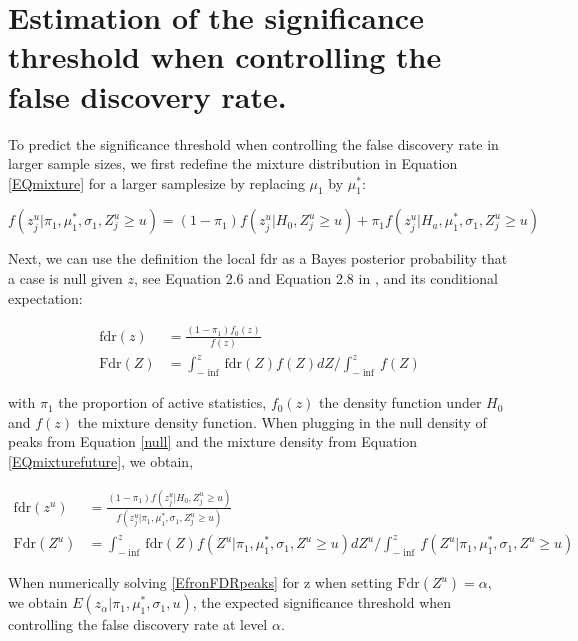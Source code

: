 \section{Estimation of the significance threshold when controlling the false discovery rate. \label{App.FDR}}

{\color{Cyan}
To predict the significance threshold when controlling the false discovery rate in larger sample sizes, we first redefine the mixture distribution in Equation \ref{EQmixture} for a larger samplesize by replacing $\mu_1$ by $\mu_1^*$:

\begin{equation} \label{EQmixturefuture}
  f(z^u_j|\pi_1,\mu_1^*,\sigma_1,Z^u_j\geq u) = (1-\pi_1) f(z^u_j|H_0,Z^u_j\geq u) + \pi_1 f(z^u_j|H_a,\mu_1^*,\sigma_1,Z^u_j \geq u)
\end{equation}

Next, we can use the definition the local fdr as a Bayes posterior probability that a case is null given $z$, see Equation 2.6 and Equation 2.8 in \citet{efron2007}, and its conditional expectation:

\begin{align}
\text{fdr}(z) &= \frac{(1-\pi_1)f_0(z)}{f(z)}  \nonumber \\
\text{Fdr}(Z) &= \int^z_{-\inf}\text{fdr}(Z)f(Z)dZ \bigg/ \int_{-\inf}^zf(Z) \label{EfronFDR}
\end{align}

with $\pi_1$ the proportion of active statistics, $f_0(z)$ the density function under $H_0$ and $f(z)$ the mixture density function.
When plugging in the null density of peaks from Equation \ref{null} and the mixture density from Equation \ref{EQmixturefuture}, we obtain,

\begin{align}
    \text{fdr}(z^u) &= \frac{(1-\pi_1)f(z^u_j|H_0,Z^u_j\geq u)}{f(z^u_j|\pi_1,\mu_1^*,\sigma_1,Z^u_j\geq u)}  \nonumber  \\
    \text{Fdr}(Z^u) &= \int^z_{-\inf}\text{fdr}(Z)f(Z^u|\pi_1,\mu_1^*,\sigma_1,Z^u\geq u)dZ^u \bigg/ \int_{-\inf}^zf(Z^u|\pi_1,\mu_1^*,\sigma_1,Z^u\geq u) \label{EfronFDRpeaks}
\end{align}

When numerically solving \ref{EfronFDRpeaks} for z when setting $\text{Fdr}(Z^u)=\alpha$, we obtain $E(z_\alpha|\pi_1,\mu_1^*,\sigma_1,u)$, the expected significance threshold when controlling the false discovery rate at level $\alpha$.
}
